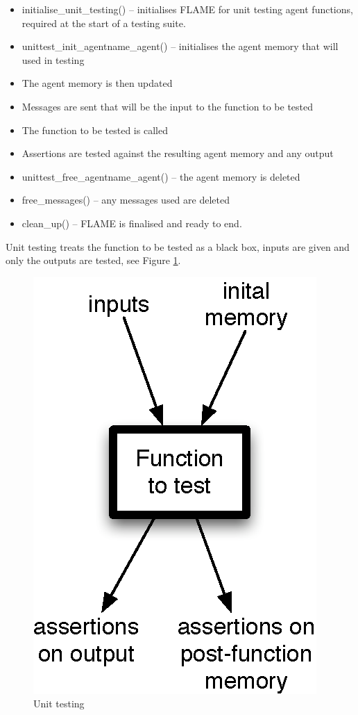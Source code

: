 \begin{itemize}
  \item initialise\_unit\_testing() -- initialises FLAME for unit testing agent
  functions, required at the start of a testing suite.
  \item unittest\_init\_agentname\_agent() -- initialises the agent memory that
  will used in testing
  \item The agent memory is then updated
  \item Messages are sent that will be the input to the function to be tested
  \item The function to be tested is called
  \item Assertions are tested against the resulting agent memory and any output
  \item unittest\_free\_agentname\_agent() -- the agent memory is deleted
  \item free\_messages() -- any messages used are deleted
  \item clean\_up() -- FLAME is finalised and ready to end.
\end{itemize}

Unit testing treats the function to be tested as a black box, inputs are given
and only the outputs are tested, see Figure \ref{fig:unittesting}.

\begin{figure}[hb]
\centering
\includegraphics[scale=1.0]{unittest.eps}
\caption{Unit testing}
\label{fig:unittesting}
\end{figure}

